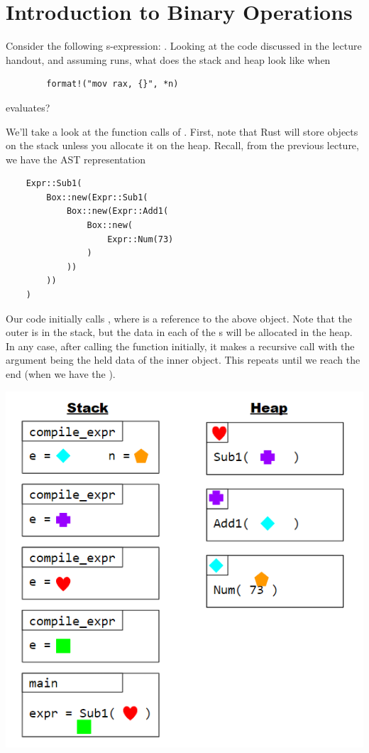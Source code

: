 \section{Introduction to Binary Operations}

\begin{mdframed}
    Consider the following s-expression: . Looking at the code discussed in the lecture handout, and assuming  runs, what does the stack and heap look like when \begin{verbatim}
        format!("mov rax, {}", *n)\end{verbatim} 
    evaluates? 

    \begin{mdframed}
        We'll take a look at the function calls of . First, note that Rust will store objects on the stack unless you allocate it on the heap. Recall, from the previous lecture, we have the AST representation 
                \begin{verbatim}
    Expr::Sub1(
        Box::new(Expr::Sub1(
            Box::new(Expr::Add1(
                Box::new(
                    Expr::Num(73)
                )
            ))
        ))
    )\end{verbatim}
        
        Our code initially calls , where  is a reference to the above object. Note that the outer  is in the stack, but the data in each of the s will be allocated in the heap. In any case, after calling the function initially, it makes a recursive call with the argument being the held data of the inner object. This repeats until we reach the end (when we have the ). 
        \begin{center}
            \includegraphics[scale=0.7]{assets/memory_diagram.png}
        \end{center}
    \end{mdframed}
\end{mdframed}

